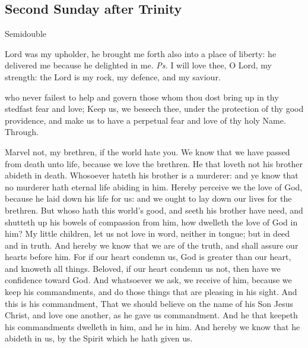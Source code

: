 \vspace{-0.25\baselineskip}

\subsection{Second Sunday after Trinity}
\begin{inhead}
    {Semidouble}
\end{inhead}

\vspace{-0.25\baselineskip}

\introit

\vspace{-0.1\baselineskip}

 Lord was my upholder, he brought me forth also into a place of liberty: he delivered me because he delighted in me. \textit{Ps.} I will love thee, O Lord, my strength: the Lord is my rock, my defence, and my saviour.

\vspace{-0.25\baselineskip}

\collect

\vspace{-0.15\baselineskip}

 who never failest to help and govern those whom thou dost bring up in thy stedfast fear and love; Keep us, we beseech thee, under the protection of thy good providence, and make us to have a perpetual fear and love of thy holy Name. Through.

 Marvel not, my brethren, if the world hate you. We know that we have passed from death unto life, because we love the brethren. He that loveth not his brother abideth in death. Whosoever hateth his brother is a murderer: and ye know that no murderer hath eternal life abiding in him. Hereby perceive we the love of God, because he laid down his life for us: and we ought to lay down our lives for the brethren. But whoso hath this world's good, and seeth his brother have need, and shutteth up his bowels of compassion from him, how dwelleth the love of God in him? My little children, let us not love in word, neither in tongue; but in deed and in truth. And hereby we know that we are of the truth, and shall assure our hearts before him. For if our heart condemn us, God is greater than our heart, and knoweth all things. Beloved, if our heart condemn us not, then have we confidence toward God. And whatsoever we ask, we receive of him, because we keep his commandments, and do those things that are pleasing in his sight. And this is his commandment, That we should believe on the name of his Son Jesus Christ, and love one another, as he gave us commandment. And he that keepeth his commandments dwelleth in him, and he in him. And hereby we know that he abideth in us, by the Spirit which he hath given us.

